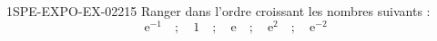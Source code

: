 \begin{exercice}{1SPE-EXPO-EX-022}{1}{5}
Ranger dans l'ordre croissant les nombres suivants :
\[\mathrm{e}^{-1} \quad;\quad 1 \quad;\quad \mathrm{e} \quad;\quad \mathrm{e}^2 \quad;\quad \mathrm{e}^{-2}\]
\end{exercice}
